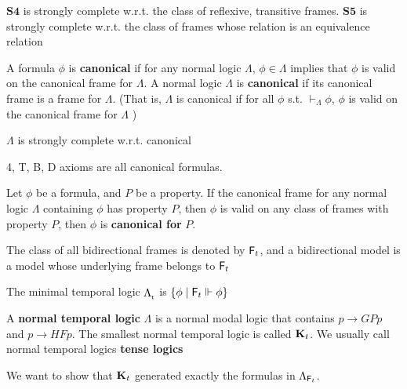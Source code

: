 \documentclass[11pt]{article}
\begin{document}
\begin{theorem}[]
\(\textbf{S4}\) is strongly complete w.r.t. the class of reflexive, transitive
frames. \(\textbf{S5}\) is strongly complete w.r.t. the class of frames whose
relation is an equivalence relation
\end{theorem}


\begin{definition}[Canonicity]
A formula \(\phi\) is \textbf{canonical} if for any normal logic \(\Lambda\), \(\phi\in\Lambda\)
implies that \(\phi\) is valid on the canonical frame for \(\Lambda\). A normal logic \(\Lambda\) is
\textbf{canonical} if its canonical frame is a frame for \(\Lambda\). (That is,
\(\Lambda\) is canonical if for all \(\phi\) s.t. \(\vdash_{\Lambda}\phi\), \(\phi\) is valid on the
canonical frame for \(\Lambda\) ) 
\end{definition}

\(\Lambda\) is strongly complete w.r.t. canonical 

4, T, B, D axioms are all canonical formulas.

\begin{definition}
Let \(\phi\) be a formula, and \(P\) be a property. If the canonical frame for any
normal logic \(\Lambda\) containing \(\phi\) has property \(P\), then \(\phi\) is valid on any class
of frames with property \(P\), then \(\phi\) is \textbf{canonical for} \(P\).
\end{definition}

The class of all bidirectional frames is denoted by \(\textsf{F}_t\), and a
bidirectional model is a model whose underlying frame belongs to \(\textsf{F}_t\)

\begin{definition}[]
The minimal temporal logic \(\Lambda_{\sf_t}\) is \(\{\phi\mid \textsf{F}_t\Vdash\phi\}\)
\end{definition}



\begin{definition}[]
A \textbf{normal temporal logic} \(\Lambda\) is a normal modal logic that contains \(p\to
   GPp\) and \(p\to HF p\). The smallest normal temporal logic is called
\(\operatorname{\textbf{K}}_t\). We usually call normal temporal logics \textbf{tense logics}
\end{definition}

We want to show that \(\operatorname{\textbf{K}}_t\) generated exactly the formulas in
\(\Lambda_{\textsf{F}_t}\).
\end{document}
